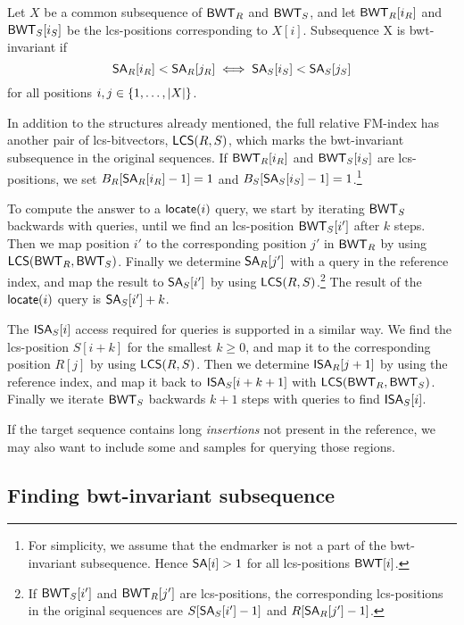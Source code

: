 \begin{definition}\label{def:bwt-invariant}
Let $X$ be a common subsequence of $\mathsf{BWT}_{R}$ and $\mathsf{BWT}_{S}$, and let
$\mathsf{BWT}_{R}[i_{R}]$ and $\mathsf{BWT}_{S}[i_{S}]$ be the lcs-positions corresponding to
$X[i]$. Subsequence X is bwt-invariant if
$$
\mathsf{SA}_{R}[i_{R}] < \mathsf{SA}_{R}[j_{R}] \iff \mathsf{SA}_{S}[i_{S}] < \mathsf{SA}_{S}[j_{S}]
$$
for all positions $i, j \in \{ 1, \dotsc, \lvert X \rvert \}$.
\end{definition}

In addition to the structures already mentioned, the full relative FM-index
has another pair of lcs-bitvectors, $\mathsf{LCS}(R,S)$, which marks the
bwt-invariant subsequence in the original sequences. If $\mathsf{BWT}_{R}[i_{R}]$ and
$\mathsf{BWT}_{S}[i_{S}]$ are lcs-positions, we set $B_{R}[\mathsf{SA}_{R}[i_{R}]-1] = 1$ and
$B_{S}[\mathsf{SA}_{S}[i_{S}]-1] = 1$.\footnote{For simplicity, we assume that the
endmarker is not a part of the bwt-invariant subsequence. Hence $\mathsf{SA}[i] > 1$
for all lcs-positions $\mathsf{BWT}[i]$.}

To compute the answer to a $\mathsf{locate}(i)$ query, we start by iterating
$\mathsf{BWT}_{S}$ backwards with \LF{} queries, until we find an lcs-position
$\mathsf{BWT}_{S}[i']$ after $k$ steps. Then we map position $i'$ to the corresponding
position $j'$ in $\mathsf{BWT}_{R}$ by using $\mathsf{LCS}(\mathsf{BWT}_{R},\mathsf{BWT}_{S})$. Finally we
determine $\mathsf{SA}_{R}[j']$ with a \locate{} query in the reference index, and map
the result to $\mathsf{SA}_{S}[i']$ by using $\mathsf{LCS}(R,S)$.\footnote{If $\mathsf{BWT}_{S}[i']$
and $\mathsf{BWT}_{R}[j']$ are lcs-positions, the corresponding lcs-positions in the
original sequences are $S[\mathsf{SA}_{S}[i']-1]$ and $R[\mathsf{SA}_{R}[j']-1]$.} The result
of the $\mathsf{locate}(i)$ query is $\mathsf{SA}_{S}[i']+k$.

The $\mathsf{ISA}_{S}[i]$ access required for \extract{} queries is supported in a
similar way. We find the lcs-position $S[i+k]$ for the smallest $k \ge 0$, and
map it to the corresponding position $R[j]$ by using $\mathsf{LCS}(R,S)$. Then we
determine $\mathsf{ISA}_{R}[j+1]$ by using the reference index, and map it back to
$\mathsf{ISA}_{S}[i+k+1]$ with $\mathsf{LCS}(\mathsf{BWT}_{R},\mathsf{BWT}_{S})$. Finally we iterate
$\mathsf{BWT}_{S}$ backwards $k+1$ steps with \LF{} queries to find $\mathsf{ISA}_{S}[i]$.

If the target sequence contains long
\emph{insertions} not present in the reference, we may also want to include
some \SA{} and \ISA{} samples for querying those regions.

\subsection{Finding bwt-invariant subsequence}

